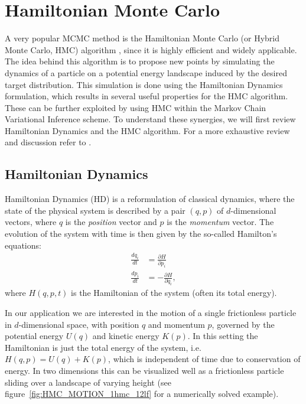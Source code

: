 \section{Hamiltonian Monte Carlo}
\label{sec:HMC}
A very popular MCMC method is the Hamiltonian Monte Carlo (or Hybrid Monte Carlo, HMC) algorithm \parencite{Duane1987}, since it is highly efficient and widely applicable. The idea behind this algorithm is to propose new points by simulating the dynamics of a particle on a potential energy landscape induced by the desired target distribution. This simulation is done using the Hamiltonian Dynamics formulation, which results in several useful properties for the HMC algorithm. These can be further exploited by using HMC within the Markov Chain Variational Inference scheme. To understand these synergies, we will first review Hamiltonian Dynamics and the HMC algorithm. For a more exhaustive review and discussion refer to \textcite{Neal2011}.

\subsection{Hamiltonian Dynamics}

Hamiltonian Dynamics (HD) is a reformulation of classical dynamics, where the state of the physical system is described by a pair $(q, p)$ of $d$-dimensional vectors, where $q$ is the \textit{position} vector and $p$ is the \textit{momentum} vector. The evolution of the system with time is then given by the so-called Hamilton's equations:
\begin{equation} \label{eq:HamiltonsEquations}
\begin{split}
\frac{dq_i}{dt} &= \frac{\partial H}{\partial p_i} \\
\frac{dp_i}{dt} &= - \frac{\partial H}{\partial q_i},
\end{split}
\end{equation}
where $H(q, p, t)$ is the Hamiltonian of the system (often its total energy).

In our application we are interested in the motion of a single frictionless particle in $d$-dimensional space, with position $q$ and momentum $p$, governed by the potential energy $U(q)$ and kinetic energy $K(p)$. In this setting the Hamiltonian is just the total energy of the system, i.e. $H(q, p) = U(q) + K(p)$, which is independent of time due to conservation of energy. In two dimensions this can be visualized well as a frictionless particle sliding over a landscape of varying height (see figure~\ref{fig:HMC_MOTION_1hmc_12lf} for a numerically solved example).

